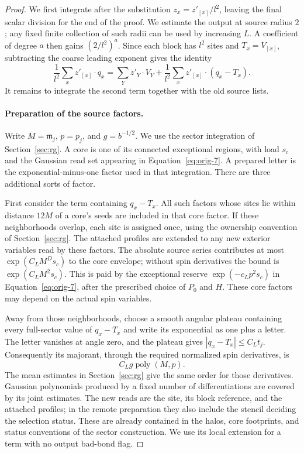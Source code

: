 \begin{proof}
We first integrate after the substitution $z_x=z'_{[x]}/l^2$, leaving
the final scalar division for the end of the proof.  We estimate the
output at source radius $2$; any fixed finite collection of such
radii can be used by increasing $L$.  A coefficient of degree $a$
then gains $(2/l^2)^a$.  Since each block has $l^2$ sites and
$T_x=V_{[x]}$, subtracting the coarse leading exponent gives the
identity
\[
 \frac1{l^2}\sum_x z'_{[x]}\cdot q_x
 =\sum_Yz'_Y\cdot V_Y+
       \frac1{l^2}\sum_xz'_{[x]}\cdot(q_x-T_x).
\]
It remains to integrate the second term together with the old
source lists.

\paragraph{Preparation of the source factors.}
Write $M=\mathfrak m_j$, $p=p_j$, and $g=b^{-1/2}$.  We use the
sector integration of Section~\ref{sec:rg}.  A core is one of its
connected exceptional regions, with load $s_c$ and the Gaussian
read set appearing in Equation~\eqref{eq:orig-7}.  A prepared
letter is the exponential-minus-one factor used in that integration.
There are three additional sorts of factor.

First consider the term containing $q_x-T_x$.  All such factors
whose sites lie within distance $12M$ of a core's seeds are included
in that core factor.  If these neighborhoods overlap, each site is
assigned once, using the ownership convention of
Section~\ref{sec:rg}.  The attached profiles are extended to any
new exterior variables read by these factors.  The absolute source
series contributes at most $\exp(C_LM^Ds_c)$ to the core envelope;
without spin derivatives the bound is
$\exp(C_LM^2s_c)$.  This is paid by the exceptional reserve
$\exp(-c_Lp^2s_c)$ in Equation~\eqref{eq:orig-7}, after the prescribed
choice of $P_0$ and $H$.  These core factors may depend on the actual
spin variables.

Away from those neighborhoods, choose a smooth angular plateau
containing every full-sector value of $q_x-T_x$ and write its
exponential as one plus a letter.  The letter vanishes at angle
zero, and the plateau gives $|q_x-T_x|\le C_Lt_j$.  Consequently
its majorant, through the required normalized spin derivatives, is
\begin{equation}
 C_Lg\operatorname{poly}(M,p).
 \label{eq:orig-30}
\end{equation}
The mean estimates in Section~\ref{sec:rg} give the same order for
those derivatives.  Gaussian polynomials produced by a fixed number
of differentiations are covered by its joint estimates.  The new
reads are the site, its block reference, and the attached profiles;
in the remote preparation they also include the stencil deciding
the selection status.  These are already contained in the halos,
core footprints, and status conventions of the sector construction.
We use its local extension for a term with no output bad-bond flag.


\end{proof}
